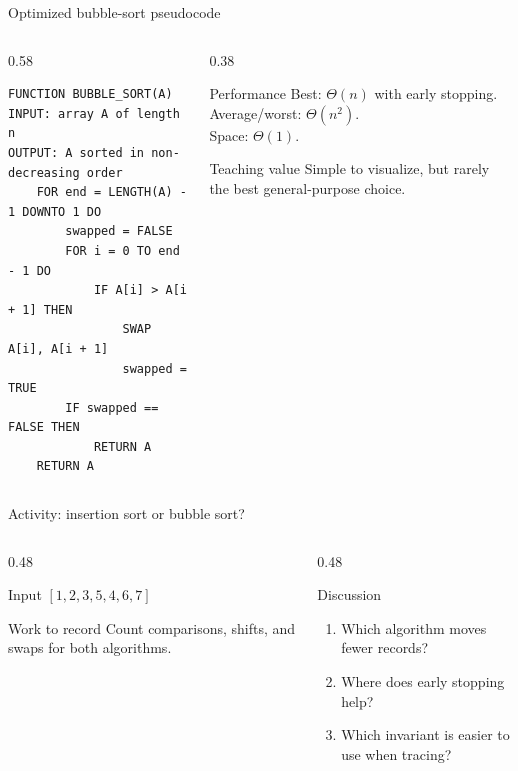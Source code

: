 \documentclass[aspectratio=169]{beamer}
\begin{document}
\begin{frame}[fragile]{Optimized bubble-sort pseudocode}
  \begin{columns}[T]
    \begin{column}{0.58\textwidth}
\begin{lstlisting}[style=pseudonumbered]
FUNCTION BUBBLE_SORT(A)
INPUT: array A of length n
OUTPUT: A sorted in non-decreasing order
    FOR end = LENGTH(A) - 1 DOWNTO 1 DO
        swapped = FALSE
        FOR i = 0 TO end - 1 DO
            IF A[i] > A[i + 1] THEN
                SWAP A[i], A[i + 1]
                swapped = TRUE
        IF swapped == FALSE THEN
            RETURN A
    RETURN A
\end{lstlisting}
    \end{column}
    \begin{column}{0.38\textwidth}
      \begin{block}{Performance}
        Best: $\Theta(n)$ with early stopping.\\
        Average/worst: $\Theta(n^2)$.\\
        Space: $\Theta(1)$.
      \end{block}
      \begin{alertblock}{Teaching value}
        Simple to visualize, but rarely the best general-purpose choice.
      \end{alertblock}
    \end{column}
  \end{columns}
\end{frame}

\begin{frame}{Activity: insertion sort or bubble sort?}
  \begin{columns}[T]
    \begin{column}{0.48\textwidth}
      \begin{block}{Input}
        $[1,2,3,5,4,6,7]$
      \end{block}
      \begin{exampleblock}{Work to record}
        Count comparisons, shifts, and swaps for both algorithms.
      \end{exampleblock}
    \end{column}
    \begin{column}{0.48\textwidth}
      \begin{alertblock}{Discussion}
        \begin{enumerate}
          \item Which algorithm moves fewer records?
          \item Where does early stopping help?
          \item Which invariant is easier to use when tracing?
        \end{enumerate}
      \end{alertblock}
    \end{column}
  \end{columns}
\end{frame}
\end{document}
